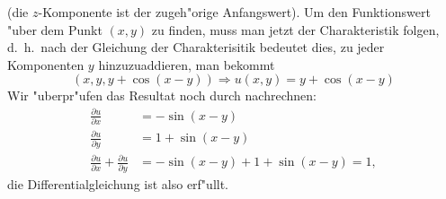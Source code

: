 \begin{loesung}
\[\]
(die $z$-Komponente ist der zugeh"orige Anfangswert). Um den Funktionswert
"uber dem Punkt $(x,y)$ zu finden, muss man jetzt der Charakteristik folgen,
d.~h.~nach der Gleichung der Charakterisitik bedeutet dies, zu jeder
Komponenten $y$ hinzuzuaddieren, man bekommt
\[
(x, y,y+\cos (x-y)) 
\Rightarrow u(x,y)=y+\cos(x-y)
\]
Wir "uberpr"ufen das Resultat noch durch nachrechnen:
\begin{align*}
\frac{\partial u}{\partial x}
&=
-\sin(x-y)
\\
\frac{\partial u}{\partial y}
&=
1+\sin(x-y)
\\
\frac{\partial u}{\partial x}
+
\frac{\partial u}{\partial y}
&=
-\sin(x-y)
+
1+\sin(x-y)
=1,
\end{align*}
die Differentialgleichung ist also erf"ullt.
\end{loesung}


